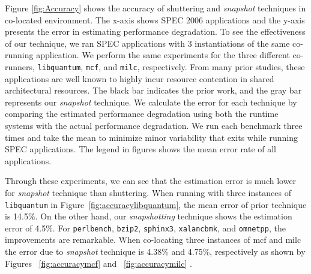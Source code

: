 \documentclass{sig-alternate}
\begin{document}
Figure \ref{fig:Accuracy} shows the accuracy of shuttering and \textit{snapshot} techniques in co-located environment. The x-axis shows SPEC 2006 applications and the y-axis presents the error in estimating performance degradation. To see the effectiveness of our technique, we ran SPEC applications with 3 instantiations of the same co-running application. We perform the same experiments for the three different co-runners, \texttt{libquantum}, \texttt{mcf}, and \texttt{milc}, respectively. From many prior studies, these applications are well known to highly incur resource contention in shared  architectural resources. The black bar indicates the prior work, and the gray bar represents our \textit{snapshot} technique. We calculate the error for each technique by comparing the estimated performance degradation using both the runtime systems with the actual performance degradation. We run each benchmark three times and take the mean to minimize minor variability that exits while running SPEC applications. The legend in figures shows the mean error rate of all applications.

Through these experiments, we can see that the estimation error is much lower for \textit{snapshot} technique than shuttering. When running with three instances of \texttt{libquantum} in Figure~\ref{fig:accuracylibquantum}, the mean error of prior technique is 14.5\%. On the other hand, our \textit{snapshotting} technique shows the estimation error of 4.5\%. For \texttt{perlbench}, \texttt{bzip2}, \texttt{sphinx3}, \texttt{xalancbmk}, and \texttt{omnetpp}, the improvements are remarkable. When co-locating three instances of mcf and milc the error due to \textit{snapshot} technique is 4.38\% and 4.75\%, respectively as shown by Figures ~\ref{fig:accuracymcf} and ~\ref{fig:accuracymilc} .
\end{document}
